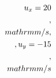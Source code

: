 \documentclass[preview]{standalone}
\begin{document}
\begin{align*}
\special{dvisvgm:raw <g id='unique000'>}u_x = 20\\,\\mathrm{m/s},\\, u_y = -15\\,\\mathrm{m/s}\special{dvisvgm:raw </g>}
\end{align*}
\end{document}

